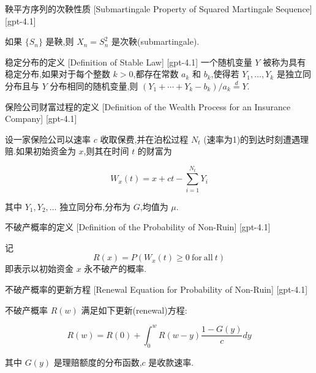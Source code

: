 \documentclass[UTF8]{ctexart}
\begin{document}
    \begin{thm}
        {鞅平方序列的次鞅性质}
        [Submartingale Property of Squared Martingale Sequence]
        [gpt-4.1]
        
如果 $\{S_n\}$ 是鞅,则 $X_n = S_n^2$ 是次鞅(submartingale).

    \end{thm}
    
    
    
    \begin{dfn}
        {稳定分布的定义}
        [Definition of Stable Law]
        [gpt-4.1]
        一个随机变量 $Y$ 被称为具有稳定分布,如果对于每个整数 $k > 0$,都存在常数 $a_k$ 和 $b_k$,使得若 $Y_1, \dots, Y_k$ 是独立同分布且与 $Y$ 分布相同的随机变量,则 $(Y_1 + \cdots + Y_k - b_k)/a_k \stackrel{d}{=} Y$.
    \end{dfn}
    
    
    
    \begin{dfn}
        {保险公司财富过程的定义}
        [Definition of the Wealth Process for an Insurance Company]
        [gpt-4.1]
        
设一家保险公司以速率 $c$ 收取保费,并在泊松过程 $N_t$ (速率为1)的到达时刻遭遇理赔.如果初始资金为 $x$,则其在时间 $t$ 的财富为

\[
W_{x}(t) = x + ct - \sum_{i=1}^{N_t} Y_i
\]

其中 $Y_1, Y_2, \ldots$ 独立同分布,分布为 $G$,均值为 $\mu$.

    \end{dfn}
    
    
    
    \begin{dfn}
        {不破产概率的定义}
        [Definition of the Probability of Non-Ruin]
        [gpt-4.1]
        
记
\[
R(x) = P(W_{x}(t) \geq 0~\mathrm{for~all~} t)
\]
即表示以初始资金 $x$ 永不破产的概率.

    \end{dfn}
    
    
    
    \begin{thm}
        {不破产概率的更新方程}
        [Renewal Equation for Probability of Non-Ruin]
        [gpt-4.1]
        
不破产概率 $R(w)$ 满足如下更新(renewal)方程:

\[
R(w) = R(0) + \int_{0}^{w} R(w-y) \frac{1-G(y)}{c} dy
\]

其中 $G(y)$ 是理赔额度的分布函数,$c$ 是收款速率.

    \end{thm}
    
\end{document}
